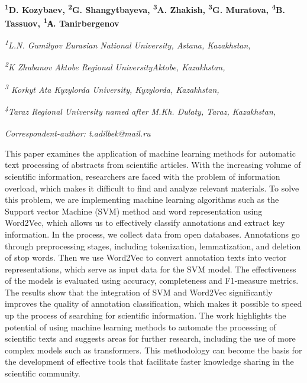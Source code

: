
\begin{articleheader}

{\bfseries \textsuperscript{1}D. Kozybaev\authorid,
\textsuperscript{2}G. Shangytbayeva\authorid,
\textsuperscript{3}A. Zhakish\authorid,
\textsuperscript{3}G. Muratova\authorid,
\textsuperscript{4}B. Tassuov\authorid,
\textsuperscript{1}А. Tanirbergenov\textsuperscript{\envelope } \authorid}
\end{articleheader}

\begin{affiliation}
\emph{\textsuperscript{1}L.N. Gumilyov Eurasian National University, Astana, Kazakhstan,}

\emph{\textsuperscript{2}K Zhubanov Aktobe Regional UniversityAktobe, Kazakhstan,}

\emph{\textsuperscript{3} Korkyt Ata Kyzylorda University, Kyzylorda, Kazakhstan,}

\emph{\textsuperscript{4}Taraz Regional University named after M.Kh. Dulaty, Taraz, Kazakhstan,}

\raggedright {\em \textsuperscript{\envelope }Correspondent-author: t.adilbek@mail.ru}
\end{affiliation}

This paper examines the application of machine learning methods for
automatic text processing of abstracts from scientific articles. With
the increasing volume of scientific information, researchers are faced
with the problem of information overload, which makes it difficult to
find and analyze relevant materials. To solve this problem, we are
implementing machine learning algorithms such as the Support vector
Machine (SVM) method and word representation using Word2Vec, which
allows us to effectively classify annotations and extract key
information. In the process, we collect data from open databases.
Annotations go through preprocessing stages, including tokenization,
lemmatization, and deletion of stop words. Then we use Word2Vec to
convert annotation texts into vector representations, which serve as
input data for the SVM model. The effectiveness of the models is
evaluated using accuracy, completeness and F1-measure metrics. The
results show that the integration of SVM and Word2Vec significantly
improves the quality of annotation classification, which makes it
possible to speed up the process of searching for scientific
information. The work highlights the potential of using machine learning
methods to automate the processing of scientific texts and suggests
areas for further research, including the use of more complex models
such as transformers. This methodology can become the basis for the
development of effective tools that facilitate faster knowledge sharing
in the scientific community.

